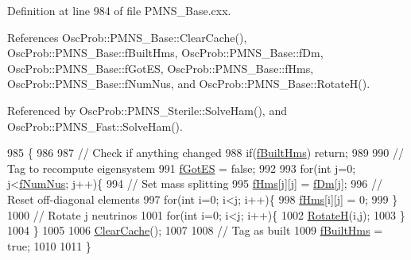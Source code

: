 Definition at line 984 of file P\+M\+N\+S\+\_\+\+Base.\+cxx.



References Osc\+Prob\+::\+P\+M\+N\+S\+\_\+\+Base\+::\+Clear\+Cache(), Osc\+Prob\+::\+P\+M\+N\+S\+\_\+\+Base\+::f\+Built\+Hms, Osc\+Prob\+::\+P\+M\+N\+S\+\_\+\+Base\+::f\+Dm, Osc\+Prob\+::\+P\+M\+N\+S\+\_\+\+Base\+::f\+Got\+ES, Osc\+Prob\+::\+P\+M\+N\+S\+\_\+\+Base\+::f\+Hms, Osc\+Prob\+::\+P\+M\+N\+S\+\_\+\+Base\+::f\+Num\+Nus, and Osc\+Prob\+::\+P\+M\+N\+S\+\_\+\+Base\+::\+Rotate\+H().



Referenced by Osc\+Prob\+::\+P\+M\+N\+S\+\_\+\+Sterile\+::\+Solve\+Ham(), and Osc\+Prob\+::\+P\+M\+N\+S\+\_\+\+Fast\+::\+Solve\+Ham().


\begin{DoxyCode}
985 \{
986 
987   \textcolor{comment}{// Check if anything changed}
988   \textcolor{keywordflow}{if}(\hyperlink{classOscProb_1_1PMNS__Base_a9ac3cadeac8db1b90f3152f476244780}{fBuiltHms}) \textcolor{keywordflow}{return};
989   
990   \textcolor{comment}{// Tag to recompute eigensystem}
991   \hyperlink{classOscProb_1_1PMNS__Base_a6dc5cd010d2d70b2324745b4e53e9839}{fGotES} = \textcolor{keyword}{false};
992 
993   \textcolor{keywordflow}{for}(\textcolor{keywordtype}{int} j=0; j<\hyperlink{classOscProb_1_1PMNS__Base_a24bb74bed63569dfe88b18fa6a08060e}{fNumNus}; j++)\{
994     \textcolor{comment}{// Set mass splitting}
995     \hyperlink{classOscProb_1_1PMNS__Base_acd3c8783e7603081eab316ea4c86c766}{fHms}[j][j] = \hyperlink{classOscProb_1_1PMNS__Base_a406a31c3b5d620e5a0cace5b411f9f70}{fDm}[j];
996     \textcolor{comment}{// Reset off-diagonal elements}
997     \textcolor{keywordflow}{for}(\textcolor{keywordtype}{int} i=0; i<j; i++)\{
998       \hyperlink{classOscProb_1_1PMNS__Base_acd3c8783e7603081eab316ea4c86c766}{fHms}[i][j] = 0;
999     \}
1000     \textcolor{comment}{// Rotate j neutrinos}
1001     \textcolor{keywordflow}{for}(\textcolor{keywordtype}{int} i=0; i<j; i++)\{
1002       \hyperlink{classOscProb_1_1PMNS__Base_aae18afd69074211335f49ec40e6011b9}{RotateH}(i,j);
1003     \}
1004   \}
1005 
1006   \hyperlink{classOscProb_1_1PMNS__Base_ac47fd33e69aa6490f99e2fd147a92f03}{ClearCache}();
1007 
1008   \textcolor{comment}{// Tag as built}
1009   \hyperlink{classOscProb_1_1PMNS__Base_a9ac3cadeac8db1b90f3152f476244780}{fBuiltHms} = \textcolor{keyword}{true};
1010 
1011 \}
\end{DoxyCode}
\mbox{\label{classOscProb_1_1PMNS__Base_ac47fd33e69aa6490f99e2fd147a92f03}} 
